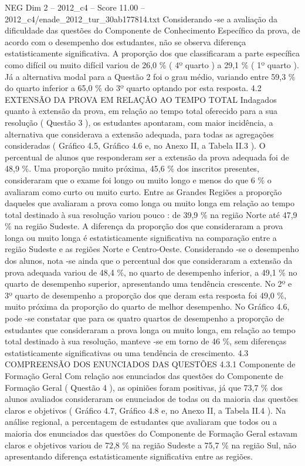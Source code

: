 \begin{textsample}{NEG Dim 2 – 2012\_c4 – Score 11.00 – 2012\_c4/enade\_2012\_tur\_30ab177814.txt}
Considerando -se a avaliação da dificuldade das questões do Componente de Conhecimento Específico da prova, de acordo com o desempenho dos estudantes, não se observa diferença estatisticamente significativa.
A proporção dos que classificaram a parte específica como difícil ou muito difícil variou de 26,0 \% ( 4º quarto ) a 29,1 \% ( 1º quarto ).
Já a alternativa modal para a Questão 2 foi o grau médio, variando entre 59,3 \% do quarto inferior a 65,0 \% do 3º quarto optando por esta resposta. 4.2 EXTENSÃO DA PROVA EM RELAÇÃO AO TEMPO TOTAL Indagados quanto à extensão da prova, em relação ao tempo total oferecido para a sua resolução ( Questão 3 ), os estudantes apontaram, com maior incidência, a alternativa que considerava a extensão adequada, para todas as agregações consideradas ( Gráfico 4.5, Gráfico 4.6 e, no Anexo II, a Tabela II.3 ).
O percentual de alunos que responderam ser a extensão da prova adequada foi de 48,9 \%.
Uma proporção muito próxima, 45,6 \% dos inscritos presentes, consideraram que o exame foi longo ou muito longo e menos do que 6 \% o avaliaram como curto ou muito curto.
Entre as Grandes Regiões a proporção daqueles que avaliaram a prova como longa ou muito longa em relação ao tempo total destinado à sua resolução variou pouco : de 39,9 \% na região Norte até 47,9 \% na região Sudeste.
A diferença da proporção dos que consideraram a prova longa ou muito longa é estatisticamente significativa na comparação entre a região Sudeste e as regiões Norte e Centro-Oeste.
Considerando -se o desempenho dos alunos, nota -se ainda que o percentual dos que consideraram a extensão da prova adequada variou de 48,4 \%, no quarto de desempenho inferior, a 49,1 \% no quarto de desempenho superior, apresentando uma tendência crescente.
No 2º e 3º quarto de desempenho a proporção dos que deram esta resposta foi 49,0 \%, muito próxima da proporção do quarto de melhor desempenho.
No Gráfico 4.6, pode -se constatar que para os quatro quartos de desempenho a proporção de estudantes que consideraram a prova longa ou muito longa, em relação ao tempo total destinado à sua resolução, manteve -se em torno de 46 \%, sem diferenças estatisticamente significativas ou uma tendência de crescimento. 4.3 COMPREENSÃO DOS ENUNCIADOS DAS QUESTÕES 4.3.1 Componente de Formação Geral Com relação aos enunciados das questões do Componente de Formação Geral ( Questão 4 ), as opiniões foram positivas, já que 73,7 \% dos alunos avaliados consideraram os enunciados de todas ou da maioria das questões claros e objetivos ( Gráfico 4.7, Gráfico 4.8 e, no Anexo II, a Tabela II.4 ).
Na análise regional, a percentagem de estudantes que avaliaram que todos ou a maioria dos enunciados das questões do Componente de Formação Geral estavam claros e objetivos variou de 72,8 \% na região Sudeste a 75,7 \% na região Sul, não apresentando diferença estatisticamente significativa entre as regiões.

\end{textsample}
